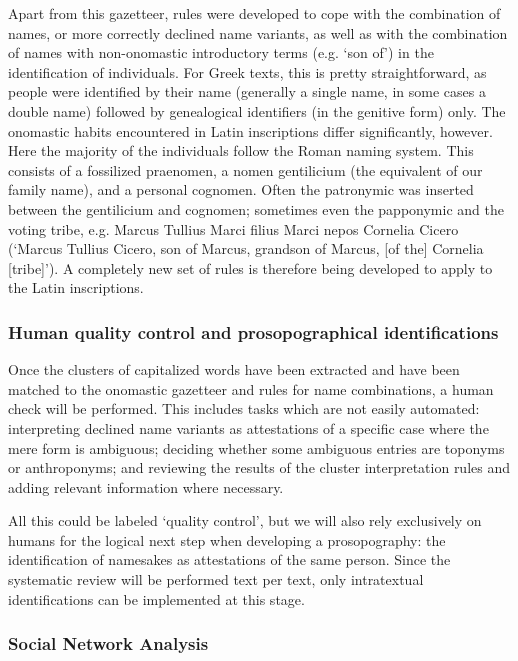 \documentclass[amsthm,ebook]{saparticle}
\begin{document}
Apart from this gazetteer, rules were developed to cope with the combination of names, or more correctly declined name
variants, as well as with the combination of names with non-onomastic introductory terms (e.g. `son of') in the
identification of individuals. For Greek texts, this is pretty straightforward, as people were identified by their name
(generally a single name, in some cases a double name) followed by genealogical identifiers (in the genitive form)
only. The onomastic habits encountered in Latin inscriptions differ significantly, however. Here the majority of the
individuals follow the Roman naming system. This consists of a fossilized praenomen, a nomen gentilicium (the
equivalent of our family name), and a personal cognomen. Often the patronymic was inserted between the gentilicium and
cognomen; sometimes even the papponymic and the voting tribe, e.g. Marcus Tullius Marci filius Marci nepos Cornelia
Cicero (`Marcus Tullius Cicero, son of Marcus, grandson of Marcus, [of the] Cornelia [tribe]'). A completely new set of
rules is therefore being developed to apply to the Latin inscriptions.




\subsubsection{Human quality control and prosopographical identifications}


Once the clusters of capitalized words have been extracted and have been matched to the onomastic gazetteer and rules
for name combinations, a human check will be performed. This includes tasks which are not easily automated:
interpreting declined name variants as attestations of a specific case where the mere form is ambiguous; deciding
whether some ambiguous entries are toponyms or anthroponyms; and reviewing the results of the cluster interpretation
rules and adding relevant information where necessary. 

All this could be labeled `quality control', but we will also rely exclusively on humans for the logical next step when
developing a prosopography: the identification of namesakes as attestations of the same person. Since the systematic
review will be performed text per text, only intratextual identifications can be implemented at this stage.




\subsubsection{Social Network Analysis}
\end{document}
